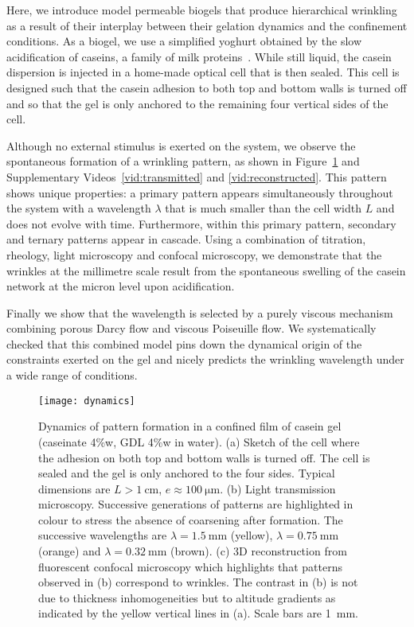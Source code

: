 \documentclass[twocolumn,superscriptaddress,showpacs,preprintnumbers,
amsmath,amssymb,prl]{revtex4-1}
\begin{document}
Here, we introduce model permeable biogels that produce hierarchical wrinkling as a result of their interplay between their gelation dynamics and the confinement conditions. 
As a biogel, we use a simplified yoghurt obtained by the slow acidification of caseins, a family of milk proteins~\cite{Roefs1986,Bremer1989,Lucey1998,Dickinson2002}. While still liquid, the casein dispersion is injected in a home-made optical cell that is then sealed. This cell is designed such that the casein adhesion to both top and bottom walls is turned off and so that the gel is only anchored to the remaining four vertical sides of the cell.

Although no external stimulus is exerted on the system, we observe the spontaneous formation of a wrinkling pattern, as shown in Figure~\ref{fig:dynamics} and Supplementary Videos~\ref{vid:transmitted} and \ref{vid:reconstructed}. This pattern shows unique properties: a primary pattern appears simultaneously throughout the system with a wavelength $\lambda$  that is much smaller than the cell width $L$ and does not evolve with time. Furthermore, within this primary pattern, secondary and ternary patterns appear in cascade.
Using a combination of titration, rheology, light microscopy and confocal microscopy, we demonstrate that the wrinkles at the millimetre scale result from the spontaneous swelling of the casein network at the micron level upon acidification.

Finally we show that the wavelength is selected by a purely viscous mechanism combining porous Darcy flow and viscous Poiseuille flow. We systematically checked that this combined model pins down the dynamical origin of the constraints exerted on the gel and nicely predicts the wrinkling wavelength under a wide range of conditions.


\begin{figure}
	\texttt{[image: dynamics]}%
	\caption{Dynamics of pattern formation in a confined film of casein gel (caseinate 4\%w, GDL 4\%w in water). (a) Sketch of the cell where the adhesion on both top and bottom walls is turned off. The cell is sealed and the gel is only anchored to the four sides. Typical dimensions are $L>\SI{1}{\centi\metre}$, $e\approx\SI{100}{\micro\metre}$. (b) Light transmission microscopy. Successive generations of patterns are highlighted in colour to stress the absence of coarsening after formation. The successive wavelengths are $\lambda=\SI{1.5}{\milli\metre}$ (yellow), $\lambda=\SI{0.75}{\milli\metre}$ (orange) and $\lambda=\SI{0.32}{\milli\metre}$ (brown). (c) 3D reconstruction from fluorescent confocal microscopy which highlights that patterns observed in (b) correspond to wrinkles. The contrast in (b) is not due to thickness inhomogeneities but to altitude gradients as indicated by the yellow vertical lines in (a). Scale bars are \SI{1}{\milli\metre}.}%
	\label{fig:dynamics}%
\end{figure}
\end{document}
